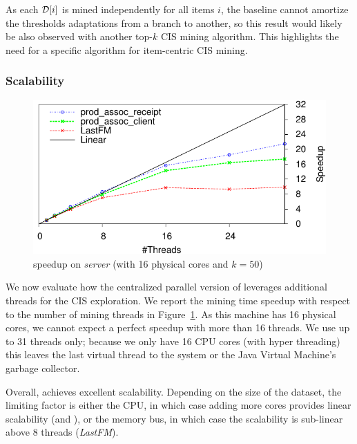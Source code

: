 As each ${\cal D}[i]$ is mined independently for all items $i$,
the baseline cannot amortize the thresholds adaptations from a branch to another,
so this result would likely be also observed with another top-$k$ CIS mining algorithm.
This highlights the need for a specific algorithm for item-centric CIS mining.


\subsubsection{Scalability}

\begin{figure}
	\centering
	\includegraphics[]{fig/toppi/multithspeedup/all-mining.pdf}
	\caption{\label{fig:toppiSpeedup}\toppi speedup on {\em server} (with 16 physical cores and $k=50$)}
\end{figure}

We now evaluate how the centralized parallel version of \toppi leverages additional threads for the CIS exploration.
We report the mining time speedup with respect to the number of mining threads in Figure~\ref{fig:toppiSpeedup}.
As this machine has 16 physical cores, we cannot expect a perfect speedup with more than 16 threads.
We use up to 31 threads only;
because we only have 16 CPU cores (with hyper threading) this leaves the last virtual thread
to the system or the Java Virtual Machine's garbage collector.

Overall, \toppi achieves excellent scalability.
Depending on the size of the dataset, the limiting factor is either the CPU,
in which case adding more cores provides linear scalability (\prodassocreceipt and \prodassocclient),
or the memory bus, in which case the scalability is sub-linear above 8 threads (\emph{LastFM}).

